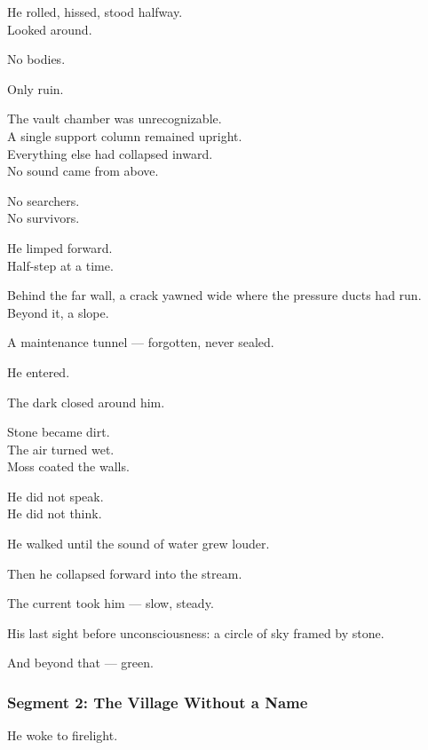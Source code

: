 \documentclass[9pt]{article}
\begin{document}
He rolled, hissed, stood halfway.\\
Looked around.

No bodies.

Only ruin.

\vspace{1em}

The vault chamber was unrecognizable.\\
A single support column remained upright.\\
Everything else had collapsed inward.\\
No sound came from above.

No searchers.\\
No survivors.

He limped forward.\\
Half-step at a time.

\vspace{1em}

Behind the far wall, a crack yawned wide where the pressure ducts had run.\\
Beyond it, a slope.

A maintenance tunnel — forgotten, never sealed.

He entered.

\vspace{1em}

The dark closed around him.

Stone became dirt.\\
The air turned wet.\\
Moss coated the walls.

He did not speak.\\
He did not think.

He walked until the sound of water grew louder.

Then he collapsed forward into the stream.

The current took him — slow, steady.

\vspace{1em}

His last sight before unconsciousness: a circle of sky framed by stone.

And beyond that — green.

\newpage

\subsubsection*{Segment 2: The Village Without a Name}

He woke to firelight.
\end{document}
